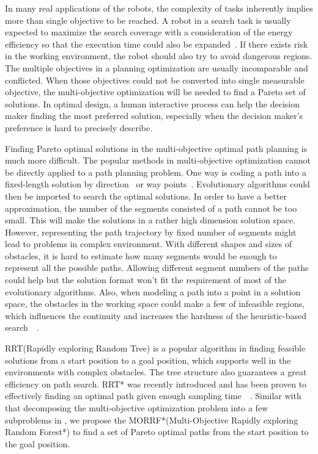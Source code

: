 \documentclass[conference]{IEEEtran}
\begin{document}

In many real applications of the robots, the complexity of tasks inherently implies more than single objective to be reached.
A robot in a search task is usually expected to maximize the search coverage with a consideration of the energy efficiency so that the execution time could also be expanded~\cite{yi2014supporting}. 
If there exists risk in the working environment, the robot should also try to avoid dangerous regions.
The multiple objectives in a planning optimization are usually incomparable and conflicted.
When those objectives could not be converted into single measurable objective, the multi-objective optimization will be needed to find a Pareto set of solutions.
In optimal design, a human interactive process can help the decision maker finding the most preferred solution, especially when the decision maker's preference is hard to precisely describe.

Finding Pareto optimal solutions in the multi-objective optimal path planning is much more difficult.
The popular methods in multi-objective optimization cannot be directly applied to a path planning problem.
One way is coding a path into a fixed-length solution by direction~\cite{Ahmed2013} or way points~\cite{5160222}.
Evolutionary algorithms could then be imported to search the optimal solutions.
In order to have a better approximation, the number of the segments consisted of a path cannot be too small.
This will make the solutions in a rather high dimension solution space.
However, representing the path trajectory by fixed number of segments might lead to problems in complex environment.
With different shapes and sizes of obstacles, it is hard to estimate how many segments would be enough to represent all the possible paths.
Allowing different segment numbers of the paths could help but the solution format won't fit the requirement of most of the evolutionary algorithms.
Also, when modeling a path into a point in a solution space, the obstacles in the working space could make a few of infeasible regions, which influences the continuity and increases the hardness of the heuristic-based search~\cite{5160222}~\cite{4358754}.

RRT(Rapidly exploring Random Tree) is a popular algorithm in finding feasible solutions from a start position to a goal position, which supports well in the environments with complex obstacles. 
The tree structure also guarantees a great efficiency on path search.
RRT* was recently introduced and has been proven to effectively finding an optimal path given enough sampling time~\cite{Karaman:2011:SAO:2000201.2000209}~\cite{Karaman.Frazzoli:RSS10}.
Similar with that decomposing the multi-objective optimization problem into a few subproblems in \cite{4358754}, we propose the MORRF*(Multi-Objective Rapidly exploring Random Forest*) to find a set of Pareto optimal paths from the start position to the goal position.
\end{document}
